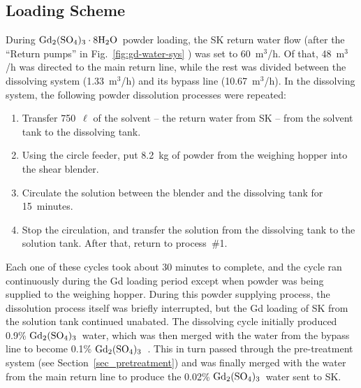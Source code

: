 \documentclass[preprint,12pt]{elsarticle}
\newcommand{\GdSOw}{$\rm Gd_2(\rm SO_4)_3\cdot \rm 8H_2O$\ }
\newcommand{\GdSO}{$\rm Gd_2(\rm SO_4)_3$\ }
\begin{document}
\subsection{Loading Scheme}%
During \GdSOw powder loading, the SK return water flow (after the ``Return pumps'' in Fig.~\ref{fig:gd-water-sys} ) was set to 60~m$^3$/h.
Of that, 48~m$^3$/h was directed to the main return line, while the rest was divided between the dissolving system (1.33~m$^3$/h) and its bypass line (10.67~m$^3$/h).
In the dissolving system, the following powder dissolution processes were repeated:
\begin{enumerate}
  \item Transfer 750~$\ell$ of the solvent -- the return water from SK -- from the solvent tank to the dissolving tank.
  \item Using the circle feeder, put 8.2~kg of powder from the weighing hopper into the shear blender.
  \item Circulate the solution between the blender and the dissolving tank for 15~minutes.
  \item Stop the circulation, and transfer the solution from the dissolving tank to the solution tank. After that, return to process~\#1.
\end{enumerate}
Each one of these cycles took about 30 minutes to complete, and the cycle ran continuously during the Gd loading period except when powder was being supplied to the weighing hopper.
During this powder supplying process, the dissolution process itself was briefly interrupted, but the Gd loading of SK from the solution tank continued unabated.
The dissolving cycle initially produced 0.9\% \GdSO water, which was then merged with the water from the bypass line to become 0.1\% \GdSO. This in turn passed through the pre-treatment system (see Section~\ref{sec_pretreatment}) and was 
finally merged with the water from the main return line to produce the  0.02\% \GdSO water sent to SK.
\end{document}
